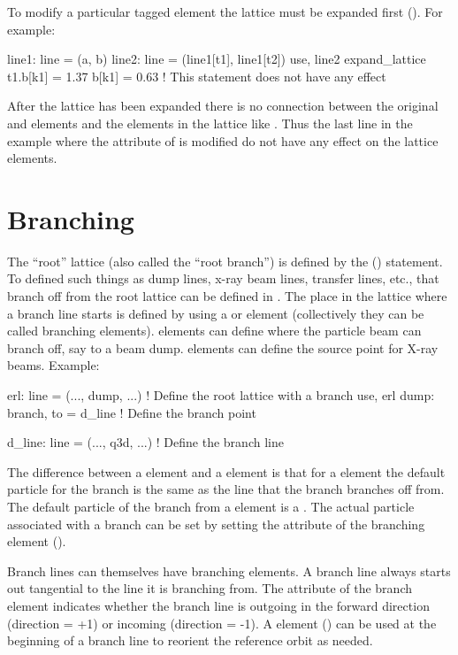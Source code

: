 To modify a particular tagged element the lattice must be expanded
first (). For example:
\begin{example}
  line1: line = (a, b)
  line2: line = (line1[t1], line1[t2])
  use, line2
  expand_lattice
  t1.b[k1] = 1.37
  b[k1] = 0.63       ! This statement does not have any effect
\end{example}
After the lattice has been expanded there is no connection between 
the original  and  elements and the elements in the lattice like
. Thus the last line in the example where the  attribute of 
is modified do not have any effect on the lattice elements. 

\section{Branching}
\label{s:branching}

The ``root'' lattice (also called the ``root branch'') is defined by
the  () statement. To defined such things as dump
lines, x-ray beam lines, transfer lines, etc., that branch off from
the root lattice can be defined in \bmad. The place in the lattice
where a branch line starts is defined by using a  or
 element (collectively they can be called branching elements).
 elements can define where the particle beam
can branch off, say to a beam dump.  elements can
define the source point for X-ray beams.  Example:
\begin{example}
  erl: line = (..., dump, ...)               ! Define the root lattice with a branch 
  use, erl
  dump: branch, to = d_line                  ! Define the branch point

  d_line: line = (..., q3d, ...)             ! Define the branch line
\end{example}
The difference between a  element and a 
element is that for a  element the default particle for the
branch is the same as the line that the branch branches off from. The
default particle of the branch from a  element is a
. The actual particle associated with a branch can be set
by setting the  attribute of the branching element
().

Branch lines can themselves have branching elements. A branch line always
starts out tangential to the line it is branching from. The
 attribute of the branch element indicates whether the
branch line is outgoing in the forward direction (direction = +1) or
incoming (direction = -1). A  element () can
be used at the beginning of a branch line to reorient the reference
orbit as needed.

